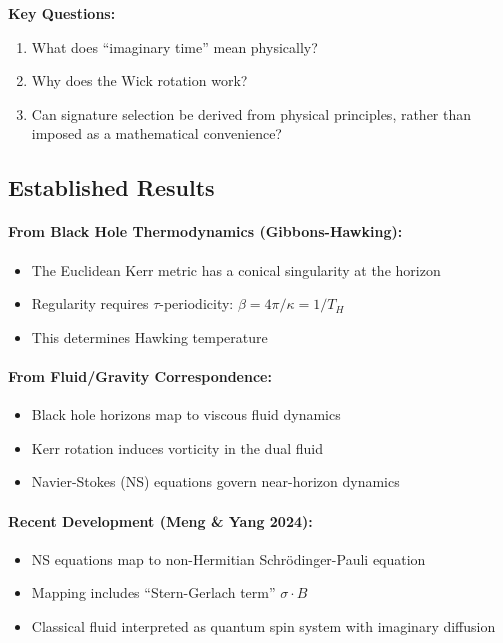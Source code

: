 \documentclass[11pt]{article}
\begin{document}
\textbf{Key Questions:}
\begin{enumerate}
  \item What does ``imaginary time'' mean physically?
  \item Why does the Wick rotation work?
  \item Can signature selection be derived from physical principles, rather than imposed as a mathematical convenience?
\end{enumerate}

\subsection{Established Results}

\paragraph{From Black Hole Thermodynamics (Gibbons-Hawking\cite{GibbonsHawking1977}):}
\begin{itemize}
\item The Euclidean Kerr metric\cite{Kerr1963} has a conical singularity at the horizon
\item Regularity requires $\tau$-periodicity: $\beta = 4\pi/\kappa = 1/T_H$
\item This determines Hawking temperature
\end{itemize}

\paragraph{From Fluid/Gravity Correspondence\cite{FluidGravity2008}:}
\begin{itemize}
\item Black hole horizons map to viscous fluid dynamics
\item Kerr rotation induces vorticity in the dual fluid
\item Navier-Stokes\cite{NavierStokesMillennium} (NS) equations govern near-horizon dynamics
\end{itemize}

\paragraph{Recent Development (Meng \& Yang 2024):}
\begin{itemize}
\item NS equations map to non-Hermitian Schr\"odinger-Pauli equation
\item Mapping includes ``Stern-Gerlach\cite{SternGerlach1922} term'' $\sigma \cdot B$
\item Classical fluid interpreted as quantum spin system with imaginary diffusion
\end{itemize}
\end{document}
